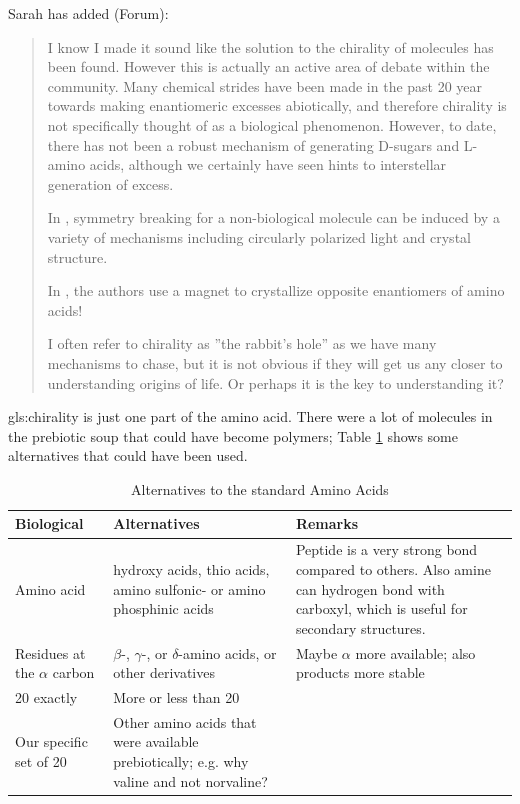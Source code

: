 \documentclass[]{article}
\begin{document}
Sarah has added (Forum):
\begin{quotation}
	I know I made it sound like the solution to the chirality of molecules has been found. However this is actually an active area of debate within the community. Many chemical strides have been made in the past 20 year towards making enantiomeric excesses abiotically, and therefore chirality is not specifically thought of as a biological phenomenon. However, to date, there has not been a robust mechanism of generating D-sugars and L-amino acids, although we certainly have seen hints to interstellar generation of excess.
	
	In \cite{soai2019role}, symmetry breaking for a non-biological molecule can be induced by a variety of mechanisms including circularly polarized light and crystal structure.
	
	In \cite{tassinari2019enantioseparation}, the authors use a magnet to crystallize opposite enantiomers of amino acids!
	
	I often refer to chirality as ''the rabbit's hole'' \cite{carroll1898alice} as we have many mechanisms to chase, but it is not obvious if they will get us any closer to understanding origins of life. Or perhaps it is the key to understanding it?
\end{quotation}

\Gls{gls:chirality} is just one part of the amino acid. There were a lot of molecules in the prebiotic soup that could have become polymers; Table \ref{table:alternatives} shows some alternatives that could have been used.
\begin{table}[H]
	\newlength\mylength
	\setlength{}
	\caption{Alternatives to the standard Amino Acids}\label{table:alternatives}
	\begin{tabular}{|p{\mylength}| p{\mylength}|p{\mylength}| } \hline
		Biological& Alternatives&Remarks\\ \hline
		Amino acid&	hydroxy acids, thio acids, amino sulfonic- or amino phosphinic acids&Peptide is a very strong bond compared to others. Also amine can hydrogen bond with carboxyl, which is useful for secondary structures. \\ \hline
		Residues at the $\alpha$ carbon& $\beta$-, $\gamma$-, or $\delta$-amino acids, or other derivatives&Maybe $\alpha$ more available; also products more stable\\ \hline
		20 exactly& More or less than 20&\\ \hline
		Our specific set of 20 &Other amino acids that were available prebiotically; e.g. why valine and not norvaline?&\\ \hline
	\end{tabular}
\end{table}
\end{document}
